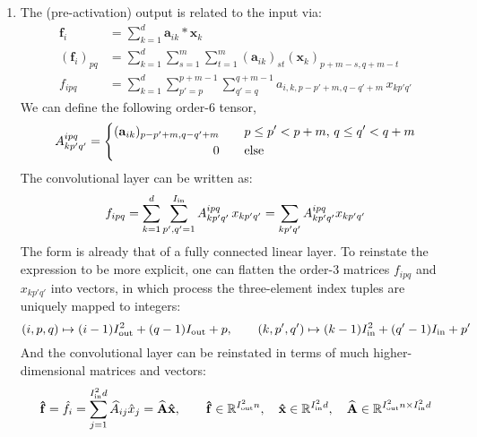 \documentclass[a4paper, 10pt]{article}
\begin{document}
\begin{enumerate}[label=(\alph*)]
    \item The (pre-activation) output is related to the input via:
    \begin{equation}
        \begin{aligned}
            \mathbf{f}_{i} &= \sum_{k=1}^d \mathbf{a}_{ik} * \mathbf{x}_k \\ 
            \left(\mathbf{f}_i\right)_{pq} &= \sum_{k=1}^d \sum_{s=1}^m \sum_{t=1}^m \left(\mathbf{a}_{ik}\right)_{st} \left(\mathbf{x}_k\right)_{p+m-s,q+m-t} \\ 
            f_{ipq} &= \sum_{k=1}^d \sum_{p'=p}^{p+m-1} \sum_{q'=q}^{q+m-1} a_{i,k,p-p'+m, q-q'+m} \, x_{kp'q'}
        \end{aligned}
    \end{equation}
    We can define the following order-6 tensor, 
    \begin{equation}
        A_{kp'q'}^{ipq} = \left\{\begin{aligned}
            (\mathbf{a}_{ik})_{p-p'+m, q-q'+m} & \qquad p \leq p' < p + m, \, q \leq q' < q + m\\
            0 & \qquad {\rm else}
        \end{aligned}\right.
    \end{equation}
    The convolutional layer can be written as:
    \begin{equation}
        f_{ipq} = \sum_{k=1}^d \sum_{p',q'=1}^{I_{\rm in}} A_{kp'q'}^{ipq} \, x_{kp'q'} = \sum_{kp'q'} A_{kp'q'}^{ipq} x_{kp'q'}
    \end{equation}
    The form is already that of a fully connected linear layer. To reinstate the expression to be more explicit, one can flatten the order-3 matrices $f_{ipq}$ and $x_{kp'q'}$ into vectors, in which process the three-element index tuples are uniquely mapped to integers:
    \begin{equation}
        (i, p, q) \mapsto (i-1) I^2_{\rm out} + (q-1) I_{\rm out} + p, \qquad (k, p', q') \mapsto (k-1) I^2_{\rm in} + (q'-1) I_{\rm in} + p'
    \end{equation}
    And the convolutional layer can be reinstated in terms of much higher-dimensional matrices and vectors:
    \begin{equation}
        \mathbf{\hat{f}} = \hat{f}_{i} = \sum_{j=1}^{I_{\rm in}^2 d} \widehat{A}_{ij} \hat{x}_j = \mathbf{\widehat{A}} \mathbf{\hat{x}}, \qquad \mathbf{\hat{f}} \in \mathbb{R}^{I_{\rm out}^2 n},\quad \mathbf{\hat{x}} \in \mathbb{R}^{I_{\rm in}^2 d}, \quad \mathbf{\widehat{A}} \in \mathbb{R}^{I_{\rm out}^2 n \times I_{\rm in}^2 d}
    \end{equation}


\end{enumerate}
\end{document}

